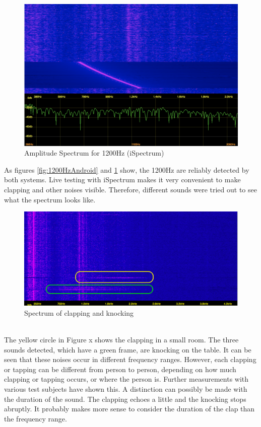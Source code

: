 \begin{figure}[b!]
	\centering
	\includegraphics[width=.8\textwidth]{imgs/iSpectrum1200Hz}
	\caption{Amplitude Spectrum for 1200Hz (iSpectrum)}
	\label{fig:1200HziSpectrum}
\end{figure}
\newpage
As figures \ref{fig:1200HzAndroid} and \ref{fig:1200HziSpectrum} show, the 1200Hz are reliably detected by both systems. Live testing with iSpectrum makes it very convenient to make clapping and other noises visible. Therefore, different sounds were tried out to see what the spectrum looks like.
\begin{figure}[h]
	\centering
	\includegraphics[width=\textwidth, trim={0 0 2cm 5cm},clip]{imgs/iSpectrumClappingKnocking}
	\caption{Spectrum of clapping and knocking}
	\label{fig:clappingKnocking}
\end{figure}\\
The yellow circle in Figure x shows the clapping in a small room. The three sounds detected, which have a green frame, are knocking on the table. It can be seen that these noises occur in different frequency ranges. However, each clapping or tapping can be different from person to person, depending on how much clapping or tapping occurs, or where the person is. Further measurements with various test subjects have shown this. A distinction can possibly be made with the duration of the sound. The clapping echoes a little and the knocking stops abruptly. It probably makes more sense to consider the duration of the clap than the frequency range.

